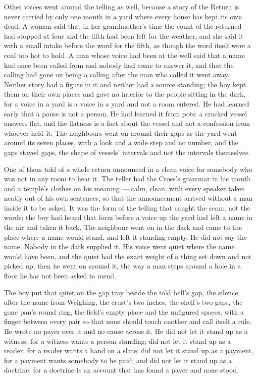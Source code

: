 Other voices went around the telling as well, because a story of the Return is never carried by only one mouth in a yard where every house has kept its own dead. A woman said that in her grandmother's time the count of the returned had stopped at four and the fifth had been left for the weather, and she said it with a small intake before the word for the fifth, as though the word itself were a coal too hot to hold. A man whose voice had been at the well said that a name had once been called from  and nobody had come to answer it, and that the calling had gone on being a calling after the man who called it went away. Neither story had a figure in it and neither had a source standing; the boy kept them on their own places and gave no interior to the people sitting in the dark, for a voice in a yard is a voice in a yard and not a room entered. He had learned early that a pause is not a person. He had learned it from pots: a cracked vessel answers flat, and the flatness is a fact about the vessel and not a confession from whoever held it. The neighbours went on around their gaps as the yard went around its seven places, with a look and a wide step and no number, and the gaps stayed gaps, the shape of vessels' intervals and not the intervals themselves.

One of them told of a whole return announced in a clean voice for somebody who was not in any room to hear it. The teller had the Cross's grammar in his mouth and a temple's clothes on his meaning --- calm, clean, with every speaker taken neatly out of his own sentences, so that the announcement arrived without a man inside it to be asked. It was the form of the telling that caught the seam, not the words; the boy had heard that form before a voice up the yard had left a name in the air and taken it back. The neighbour went on in the dark and came to the place where a name would stand, and left it standing empty. He did not say the name. Nobody in the dark supplied it. His voice went quiet where the name would have been, and the quiet had the exact weight of a thing set down and not picked up; then he went on around it, the way a man steps around a hole in a floor he has not been asked to mend.

The boy put that quiet on the gap tray beside the told bell's gap, the silence after the name from Weighing, the crust's two inches, the shelf's two gaps, the gone pan's round ring, the field's empty place and the unfigured spaces, with a finger between every pair so that none should touch another and call itself a rule. He wrote no payer over it and no cause across it. He did not let it stand up as a witness, for a witness wants a person standing; did not let it stand up as a reader, for a reader wants a hand on a slate; did not let it stand up as a payment, for a payment wants somebody to be paid; and did not let it stand up as a doctrine, for a doctrine is an account that has found a payer and none stood.

